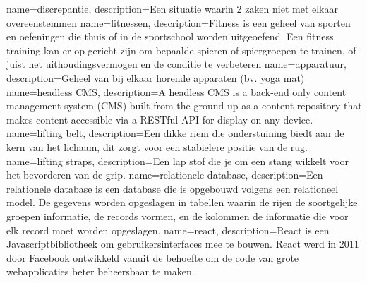 {   name={discrepantie},
    description={Een situatie waarin 2 zaken niet met elkaar overeenstemmen}
}
{   name={fitnessen},
    description={Fitness is een geheel van sporten en oefeningen die thuis of in de sportschool worden uitgeoefend. Een fitness training kan er op gericht zijn om bepaalde spieren of spiergroepen te trainen, of juist het uithoudingsvermogen en de conditie te verbeteren}
}
{   name={apparatuur},
    description={Geheel van bij elkaar horende apparaten (bv. yoga mat)}
}
{   name={headless CMS},
    description={A headless CMS is a back-end only content management system (CMS) built from the ground up as a content repository that makes content accessible via a RESTful API for display on any device.}
}
{   name={lifting belt},
    description={Een dikke riem die onderstuining biedt aan de kern van het lichaam, dit zorgt voor een stabielere positie van de rug.}
}
{   name={lifting straps},
    description={Een lap stof die je om een stang wikkelt voor het bevorderen van de grip.}
}
{   name={relationele database},
    description={Een relationele database is een database die is opgebouwd volgens een relationeel model. De gegevens worden opgeslagen in tabellen waarin de rijen de soortgelijke groepen informatie, de records vormen, en de kolommen de informatie die voor elk record moet worden opgeslagen.}
}
{   name={react},
    description={React is een Javascriptbibliotheek om gebruikersinterfaces mee te bouwen. React werd in 2011 door Facebook ontwikkeld vanuit de behoefte om de code van grote webapplicaties beter beheersbaar te maken.}
}
